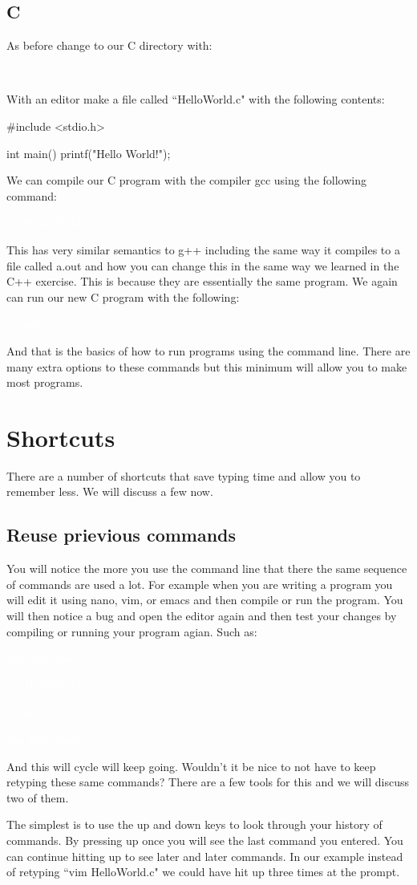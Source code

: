 \documentclass{book}
\newcommand{\commandline}[1]{\begin{center} \colorbox{Dark}{\textcolor{white}{#1}} \end{center}}
\begin{document}
\subsection{C}
As before change to our C directory with:
\commandline{cd ../C}
With an editor make a file called ``HelloWorld.c" with the following contents:
\begin{verbatimtab}
    #include <stdio.h>
    
    int main() {
        printf("Hello World!\n");
    }
\end{verbatimtab}
We can compile our C program with the compiler gcc using the following command:
\commandline{gcc HelloWorld.c}
This has very similar semantics to g++ including the same way it compiles to a file called a.out and how you can change this in the same way we learned in the C++ exercise. This is because they are essentially the same program. We again can run our new C program with the following:
\commandline{./a.out}
And that is the basics of how to run programs using the command line. There are many extra options to these commands but this minimum will allow you to make most programs.


\section{Shortcuts}
There are a number of shortcuts that save typing time and allow you to remember less. We will discuss a few now.
\subsection{Reuse prievious commands}
You will notice the more you use the command line that there the same sequence of commands are used a lot. For example when you are writing a program you will edit it using nano, vim, or emacs and then compile or run the program. You will then notice a bug and open the editor again and then test your changes by compiling or running your program agian. Such as:
\commandline{vim HelloWorld.c}
\commandline{gcc HelloWorld.c}
\commandline{./a.out}
\commandline{vim HelloWorld.c}
And this will cycle will keep going. Wouldn't it be nice to not have to keep retyping these same commands? There are a few tools for this and we will discuss two of them. 

The simplest is to use the up and down keys to look through your history of commands. By pressing up once you will see the last command you entered. You can continue hitting up to see later and later commands. In our example instead of retyping ``vim HelloWorld.c" we could have hit up three times at the prompt. 
\end{document}
